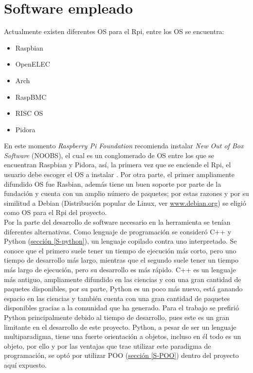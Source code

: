 \documentclass[11pt,lettersize]{article} %
\newcommand{\seccion}[1]{\hyperref[{#1}]{sección \ref*{#1}}}
\begin{document}
\cleardoublepage
\section{Software empleado}
\label{S-software}

Actualmente existen diferentes OS para el Rpi, entre los OS se encuentra:
\begin{itemize}[nolistsep]
	\item Raspbian
	\item OpenELEC
	\item Arch
	\item RaspBMC
	\item RISC OS
	\item Pidora
\end{itemize}
En este momento \emph{Raspberry Pi Foundation} recomienda instalar \textit{New Out of Box Software} (NOOBS), el cual es un conglomerado de OS entre los que se encuentran Raspbian y Pidora, así, la primera vez que se enciende el Rpi, el usuario debe escoger el OS a instalar \cite{Raspberry}. Por otra parte, el primer ampliamente difundido OS fue Rasbian, además tiene un buen soporte por parte de la fundación y cuenta con un amplio número de paquetes; por estas razones y por su similitud a Debian (Distribución popular de Linux, ver \href{http://www.debian.org}{www.debian.org}) se eligió como OS para el Rpi del proyecto. \\

Por la parte del desarrollo de software necesario en la herramienta se tenían diferentes alternativas. Como lenguaje de programación se consideró C++ y Python (\seccion{S-python}), un lenguaje copilado contra uno interpretado. Se conoce que el primero suele tener un tiempo de ejecución más corto, pero uno tiempo de desarrollo más largo, mientras que el segundo suele tener un tiempo más largo de ejecución, pero su desarrollo es más rápido. C++ es un lenguaje más antiguo, ampliamente difundido en las ciencias y con una gran cantidad de paquetes disponibles, por su parte, Python es un poco más nuevo, está ganando espacio en las ciencias y también cuenta con una gran cantidad de paquetes disponibles gracias a la comunidad que ha generado. Para el trabajo se prefirió Python principalmente debido al tiempo de desarrollo, pues este es un gran limitante en el desarrollo de este proyecto. Python, a pesar de ser un lenguaje multiparadigma, tiene una fuerte orientación a objetos, incluso en él todo es un objeto, por ello y por las ventajas que trae utilizar este paradigma de programación, se optó por utilizar POO (\seccion{S-POO}) dentro del proyecto aquí expuesto.\\
\end{document}
